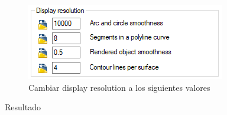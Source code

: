\documentclass{report}
\begin{document}
\begin{figure}[H]
	\centering
	\includegraphics[width=0.85\linewidth, height=0.5\textheight,keepaspectratio]{Imagenes/autocad_display_resolution_02}
	\caption{Cambiar display resolution a los siguientes valores}
	\label{fig:autocaddisplayresolution02}
\end{figure}

{\LARGE Resultado}
\end{document}
